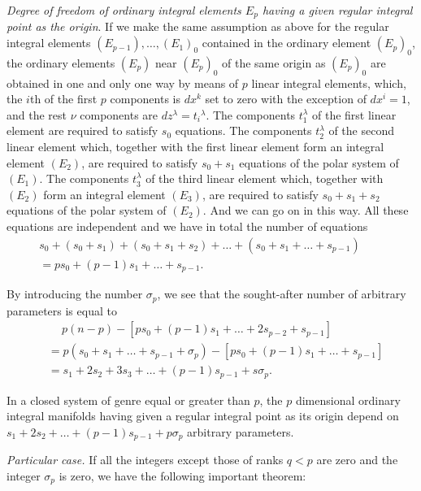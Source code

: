 \vspace{12pt}\fsec \emph{Degree of freedom of ordinary integral elements $E_{p}$ having a given regular integral point as the origin}. If we make the same assumption as above for the regular integral elements $(E_{p-1}),\dots,(E_{1})_{0}$ contained in the ordinary element $(E_{p})_{0}$, the ordinary elements $(E_{p})$ near $(E_{p})_{0}$ of the same origin as $(E_{p})_{0}$ are obtained in one and only one way by means of $p$ linear integral elements, which, the $i$th of the first $p$ components is $dx^{k}$ set to zero with the exception of $dx^{i}=1$, and the rest $\nu$ components are $dz^{\lambda}=t_{i}{}^{\lambda}$. The components $t_{1}^{\lambda}$ of the first linear element are required to satisfy  $s_{0}$ equations. The components $t_{2}^{\lambda}$ of the second linear element which, together with the first linear element form an integral element $(E_{2})$, are required to satisfy $s_{0}+s_{1}$ equations of the polar system of $(E_{1})$. The components $t_{3}^{\lambda}$ of the third linear element which, together with $(E_{2})$ form an integral element $(E_{3})$, are required to satisfy $s_{0}+s_{1}+s_{2}$ equations of the polar system of $(E_{2})$. And we can go on in this way. All these equations are independent and we have in total the number of equations
\begin{align*}
s_{0}+(s_{0}+s_{1})+(s_{0}+s_{1}+s_{2})+\dots+(s_{0}+s_{1}+\dots+s_{p-1})\qquad\\
=ps_{0}+(p-1)s_{1}+\dots+s_{p-1}.
\end{align*}

By introducing the number $\sigma_{p}$, we see that the sought-after number of arbitrary parameters is equal to
\begin{align*}
 &\quad\  p(n-p)-[ps_{0}+(p-1)s_{1}+\dots+2s_{p-2}+s_{p-1}]\\
&=p(s_{0}+s_{1}+\dots+s_{p-1}+\sigma_{p})-[ps_{0}+(p-1)s_{1}+\dots+s_{p-1}]\\
&=s_{1}+2s_{2}+3s_{3}+\dots+(p-1)s_{p-1}+s\sigma_{p}.
\end{align*}

\begin{thm*}
  In a closed system of genre equal or greater than $p$, the $p$ dimensional ordinary integral manifolds having given a regular integral point as its origin depend on $s_{1}+2s_{2}+\dots+(p-1)s_{p-1}+p\sigma_{p}$ arbitrary parameters.
\end{thm*}


\vspace{12pt}\fsec \emph{Particular case.} If all the integers except those of ranks $q<p$ are zero and the integer $\sigma_{p}$ is zero, we have the following important theorem:

